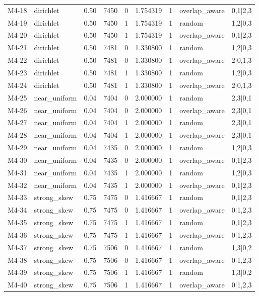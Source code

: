 \begin{longtable}{@{}llllrrrll@{}}
M4-18 & dirichlet & 0.50 & 7450 & 0 & 1.754319 & 1 & overlap\_aware & 0,1$\vert$2,3\\
M4-19 & dirichlet & 0.50 & 7450 & 1 & 1.754319 & 1 & random & 1,2$\vert$0,3\\
M4-20 & dirichlet & 0.50 & 7450 & 1 & 1.754319 & 1 & overlap\_aware & 0,1$\vert$2,3\\
M4-21 & dirichlet & 0.50 & 7481 & 0 & 1.330800 & 1 & random & 1,2$\vert$0,3\\
M4-22 & dirichlet & 0.50 & 7481 & 0 & 1.330800 & 1 & overlap\_aware & 2$\vert$0,1,3\\
M4-23 & dirichlet & 0.50 & 7481 & 1 & 1.330800 & 1 & random & 1,2$\vert$0,3\\
M4-24 & dirichlet & 0.50 & 7481 & 1 & 1.330800 & 1 & overlap\_aware & 2$\vert$0,1,3\\
M4-25 & near\_uniform & 0.04 & 7404 & 0 & 2.000000 & 1 & random & 2,3$\vert$0,1\\
M4-26 & near\_uniform & 0.04 & 7404 & 0 & 2.000000 & 1 & overlap\_aware & 2,3$\vert$0,1\\
M4-27 & near\_uniform & 0.04 & 7404 & 1 & 2.000000 & 1 & random & 2,3$\vert$0,1\\
M4-28 & near\_uniform & 0.04 & 7404 & 1 & 2.000000 & 1 & overlap\_aware & 2,3$\vert$0,1\\
M4-29 & near\_uniform & 0.04 & 7435 & 0 & 2.000000 & 1 & random & 1,2$\vert$0,3\\
M4-30 & near\_uniform & 0.04 & 7435 & 0 & 2.000000 & 1 & overlap\_aware & 0,1$\vert$2,3\\
M4-31 & near\_uniform & 0.04 & 7435 & 1 & 2.000000 & 1 & random & 1,2$\vert$0,3\\
M4-32 & near\_uniform & 0.04 & 7435 & 1 & 2.000000 & 1 & overlap\_aware & 0,1$\vert$2,3\\
M4-33 & strong\_skew & 0.75 & 7475 & 0 & 1.416667 & 1 & random & 0,1$\vert$2,3\\
M4-34 & strong\_skew & 0.75 & 7475 & 0 & 1.416667 & 1 & overlap\_aware & 0$\vert$1,2,3\\
M4-35 & strong\_skew & 0.75 & 7475 & 1 & 1.416667 & 1 & random & 0,1$\vert$2,3\\
M4-36 & strong\_skew & 0.75 & 7475 & 1 & 1.416667 & 1 & overlap\_aware & 0$\vert$1,2,3\\
M4-37 & strong\_skew & 0.75 & 7506 & 0 & 1.416667 & 1 & random & 1,3$\vert$0,2\\
M4-38 & strong\_skew & 0.75 & 7506 & 0 & 1.416667 & 1 & overlap\_aware & 0$\vert$1,2,3\\
M4-39 & strong\_skew & 0.75 & 7506 & 1 & 1.416667 & 1 & random & 1,3$\vert$0,2\\
M4-40 & strong\_skew & 0.75 & 7506 & 1 & 1.416667 & 1 & overlap\_aware & 0$\vert$1,2,3\\
\bottomrule
\end{longtable}
